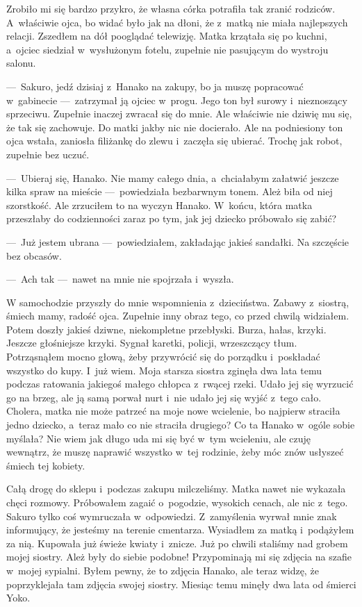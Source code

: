 Zrobiło mi się bardzo przykro, że własna córka potrafiła tak zranić rodziców. A~właściwie ojca, bo widać było jak na dłoni, że z~matką nie miała najlepszych relacji. Zszedłem na dół pooglądać telewizję. Matka krzątała się po kuchni, a~ojciec siedział w~wysłużonym fotelu, zupełnie nie pasującym do wystroju salonu.

---~Sakuro, jedź dzisiaj z~Hanako na zakupy, bo ja muszę popracować w~gabinecie ---~zatrzymał ją ojciec w~progu. Jego ton był surowy i~nieznoszący sprzeciwu. Zupełnie inaczej zwracał się do mnie. Ale właściwie nie dziwię mu się, że tak się zachowuje. Do matki jakby nic nie docierało. Ale na podniesiony ton ojca wstała, zaniosła filiżankę do zlewu i~zaczęła się ubierać. Trochę jak robot, zupełnie bez uczuć. 

---~Ubieraj się, Hanako. Nie mamy całego dnia, a~chciałabym załatwić jeszcze kilka spraw na mieście ---~powiedziała bezbarwnym tonem. Ależ biła od niej szorstkość. Ale zrzuciłem to na wyczyn Hanako. W~końcu, która matka przeszłaby do codzienności zaraz po tym, jak jej dziecko próbowało się zabić? 

---~Już jestem ubrana ---~powiedziałem, zakładając jakieś sandałki. Na szczęście bez obcasów.

---~Ach tak ---~nawet na mnie nie spojrzała i~wyszła.

W samochodzie przyszły do mnie wspomnienia z~dzieciństwa. Zabawy z~siostrą, śmiech mamy, radość ojca. Zupełnie inny obraz tego, co przed chwilą widziałem. Potem doszły jakieś dziwne, niekompletne przebłyski. Burza, hałas, krzyki. Jeszcze głośniejsze krzyki. Sygnał karetki, policji, wrzeszczący tłum. Potrząsnąłem mocno głową, żeby przywrócić się do porządku i~poskładać wszystko do kupy. I~już wiem. Moja starsza siostra zginęła dwa lata temu podczas ratowania jakiegoś małego chłopca z~rwącej rzeki. Udało jej się wyrzucić go na brzeg, ale ją samą porwał nurt i~nie udało jej się wyjść z~tego cało. Cholera, matka nie może patrzeć na moje nowe wcielenie, bo najpierw straciła jedno dziecko, a~teraz mało co nie straciła drugiego? Co ta Hanako w~ogóle sobie myślała? Nie wiem jak długo uda mi się być w~tym wcieleniu, ale czuję wewnątrz, że muszę naprawić wszystko w~tej rodzinie, żeby móc znów usłyszeć śmiech tej kobiety.

Całą drogę do sklepu i~podczas zakupu milczeliśmy. Matka nawet nie wykazała chęci rozmowy. Próbowałem zagaić o~pogodzie, wysokich cenach, ale nic z~tego. Sakuro tylko coś wymruczała w~odpowiedzi. Z~zamyślenia wyrwał mnie znak informujący, że jesteśmy na terenie cmentarza. Wysiadłem za matką i~podążyłem za nią. Kupowała już świeże kwiaty i~znicze. Już po chwili staliśmy nad grobem mojej siostry. Ależ były do siebie podobne! Przypominają mi się zdjęcia na szafie w~mojej sypialni. Byłem pewny, że to zdjęcia Hanako, ale teraz widzę, że poprzyklejała tam zdjęcia swojej siostry. Miesiąc temu minęły dwa lata od śmierci Yoko. 

